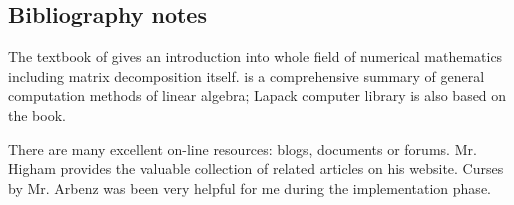 \begin{refsection}


\section{Bibliography notes}
\label{sec:qrbiblio}

The textbook of {} \textcite{ralston2012first} gives an introduction into
whole field of numerical mathematics including matrix decomposition itself.
\cite{golub2013matrix} is a comprehensive summary of general computation
methods of linear algebra; Lapack computer library
is also based on the book.

There are many excellent on-line resources: blogs, documents or forums.
Mr. Higham provides the valuable collection
of related articles on his website.
Curses by Mr. Arbenz was been very helpful
for me during the implementation phase.


\printbibliography[heading=subbibliography]
\end{refsection}
